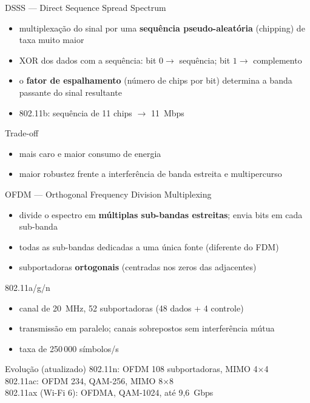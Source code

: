 \documentclass[aspectratio=169,11pt]{beamer}
\begin{document}
\begin{frame}{DSSS --- Direct Sequence Spread Spectrum}
  \begin{itemize}
    \item multiplexação do sinal por uma \textbf{sequência pseudo-aleatória} (chipping) de taxa muito maior
    \item XOR dos dados com a sequência: bit $0 \rightarrow$ sequência; bit $1 \rightarrow$ complemento
    \item o \textbf{fator de espalhamento} (número de chips por bit) determina a banda passante do sinal resultante
    \item 802.11b: sequência de 11 chips $\rightarrow$ 11~Mbps
  \end{itemize}
  \begin{block}{Trade-off}
    \begin{itemize}
      \item mais caro e maior consumo de energia
      \item maior robustez frente a interferência de banda estreita e multipercurso
    \end{itemize}
  \end{block}
\end{frame}

\begin{frame}{OFDM --- Orthogonal Frequency Division Multiplexing}
  \begin{itemize}
    \item divide o espectro em \textbf{múltiplas sub-bandas estreitas}; envia bits em cada sub-banda
    \item todas as sub-bandas dedicadas a uma única fonte (diferente do FDM)
    \item subportadoras \textbf{ortogonais} (centradas nos zeros das adjacentes)
  \end{itemize}
  \begin{block}{802.11a/g/n}
    \begin{itemize}
      \item canal de 20~MHz, 52 subportadoras (48 dados + 4 controle)
      \item transmissão em paralelo; canais sobrepostos sem interferência mútua
      \item taxa de 250\,000 símbolos/s
    \end{itemize}
  \end{block}
  \begin{exampleblock}{Evolução (atualizado)}
    802.11n: OFDM 108 subportadoras, MIMO 4$\times$4\\802.11ac: OFDM 234, QAM-256, MIMO 8$\times$8\\802.11ax (Wi-Fi 6): OFDMA, QAM-1024, até 9,6~Gbps
  \end{exampleblock}
\end{frame}
\end{document}
